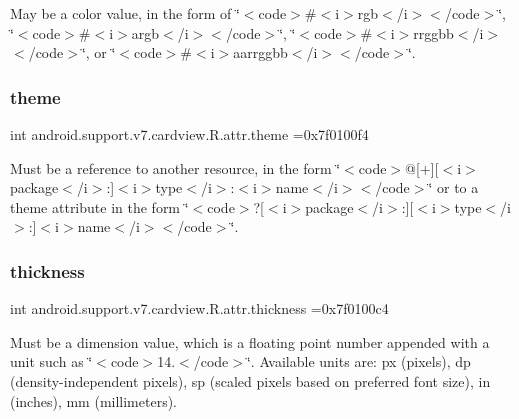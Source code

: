 May be a color value, in the form of \char`\"{}$<$code$>$\#$<$i$>$rgb$<$/i$>$$<$/code$>$\char`\"{}, \char`\"{}$<$code$>$\#$<$i$>$argb$<$/i$>$$<$/code$>$\char`\"{}, \char`\"{}$<$code$>$\#$<$i$>$rrggbb$<$/i$>$$<$/code$>$\char`\"{}, or \char`\"{}$<$code$>$\#$<$i$>$aarrggbb$<$/i$>$$<$/code$>$\char`\"{}. \mbox{\label{classandroid_1_1support_1_1v7_1_1cardview_1_1R_1_1attr_aae85a62e5df536faad431dd28ed3e990}} 
\subsubsection{\texorpdfstring{theme}{theme}}
{\footnotesize\ttfamily int android.\+support.\+v7.\+cardview.\+R.\+attr.\+theme =0x7f0100f4\hspace{0.3cm}{\ttfamily [static]}}

Must be a reference to another resource, in the form \char`\"{}$<$code$>$@\mbox{[}+\mbox{]}\mbox{[}$<$i$>$package$<$/i$>$\+:\mbox{]}$<$i$>$type$<$/i$>$\+:$<$i$>$name$<$/i$>$$<$/code$>$\char`\"{} or to a theme attribute in the form \char`\"{}$<$code$>$?\mbox{[}$<$i$>$package$<$/i$>$\+:\mbox{]}\mbox{[}$<$i$>$type$<$/i$>$\+:\mbox{]}$<$i$>$name$<$/i$>$$<$/code$>$\char`\"{}. \mbox{\label{classandroid_1_1support_1_1v7_1_1cardview_1_1R_1_1attr_a6886117481f6f9c9efb4113aa9fc48fe}} 
\subsubsection{\texorpdfstring{thickness}{thickness}}
{\footnotesize\ttfamily int android.\+support.\+v7.\+cardview.\+R.\+attr.\+thickness =0x7f0100c4\hspace{0.3cm}{\ttfamily [static]}}

Must be a dimension value, which is a floating point number appended with a unit such as \char`\"{}$<$code$>$14.\+5sp$<$/code$>$\char`\"{}. Available units are\+: px (pixels), dp (density-\/independent pixels), sp (scaled pixels based on preferred font size), in (inches), mm (millimeters). 

